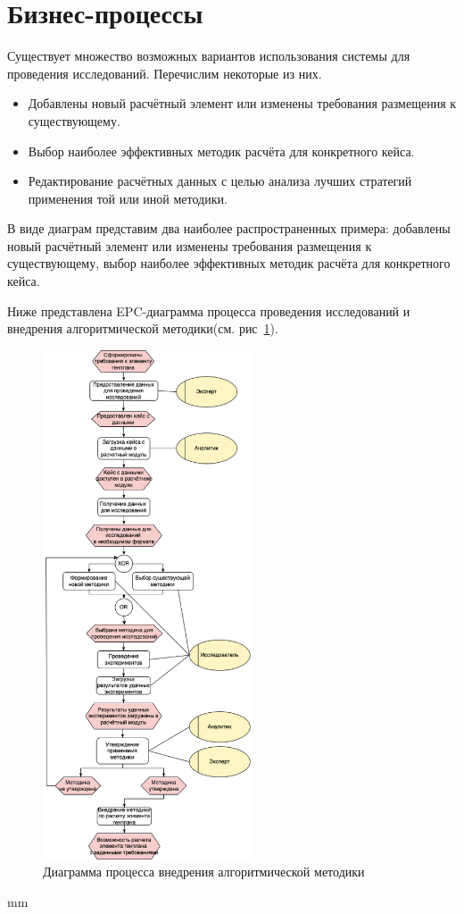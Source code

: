 \section{\Large{Бизнес-процессы}}

Существует множество возможных вариантов использования системы для проведения исследований.
Перечислим некоторые из них.
\begin{itemize}
	\item Добавлены новый расчётный элемент или изменены требования размещения к существующему.
	\item Выбор наиболее эффективных методик расчёта для конкретного кейса.
	\item Редактирование расчётных данных с целью анализа лучших стратегий применения той или иной методики.
\end{itemize}

В виде диаграм представим два наиболее распространенных примера: добавлены новый расчётный элемент
или изменены требования размещения к существующему, выбор наиболее эффективных методик расчёта для конкретного кейса.

Ниже представлена EPC-диаграмма процесса проведения исследований и
внедрения алгоритмической методики(см. рис\ \ref{pic:analysis__usecases-epc}).

\begin{figure}[H]
	\hspace*{-2.5 cm}\includegraphics[width=0.55\textwidth, left]{analysis/pictures/usecases/epc}
	\caption{Диаграмма процесса внедрения алгоритмической методики}
	\label{pic:analysis__usecases-epc}
\end{figure}
 mm

